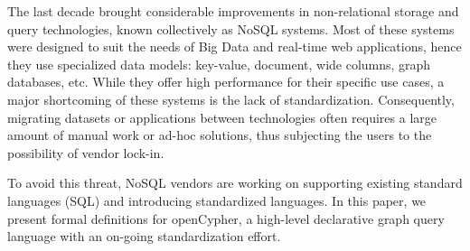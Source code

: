 The last decade brought considerable improvements in non-relational storage and query technologies, known collectively as NoSQL systems.
Most of these systems were designed to suit the needs of Big Data and real-time web applications, hence they use specialized data models: key-value, document, wide columns, graph databases, etc.
While they offer high performance for their specific use cases, a major shortcoming of these systems is the lack of standardization. Consequently, migrating datasets or applications between technologies often requires a large amount of manual work or ad-hoc solutions, thus subjecting the users to the possibility of vendor lock-in.

To avoid this threat, NoSQL vendors are working on supporting existing standard languages (\eg SQL) and introducing standardized languages. In this paper, we present formal definitions for openCypher, a high-level declarative graph query language with an on-going standardization effort.
